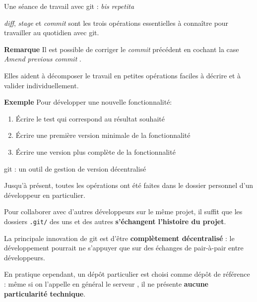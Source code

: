 \documentclass[12pt,handout,ignorenonframetext,]{beamer}
\providecommand{\tightlist}{%
  \setlength{\itemsep}{0pt}\setlength{\parskip}{0pt}}
\newcommand{\intertitre}[1]{\textbf{\textcolor{redInsee}{#1}}}
\begin{document}
\begin{frame}{Une séance de travail avec git : \emph{bis repetita}}

\emph{diff}, \emph{stage} et \emph{commit} sont les trois opérations
essentielles à connaître pour travailler au quotidien avec git.

\bigskip \pause \intertitre{Remarque} Il est possible de corriger le
\emph{commit} précédent en cochant la case
\og \textit{Amend previous commit} \fg{}.

\bigskip \pause Elles aident à décomposer le travail en petites
opérations faciles à décrire et à valider individuellement.

\bigskip \pause \intertitre{Exemple} Pour développer une nouvelle
fonctionnalité:

\begin{enumerate}
\def\labelenumi{\arabic{enumi}.}
\tightlist
\item
  Écrire le test qui correspond au résultat souhaité
\item
  Écrire une première version minimale de la fonctionnalité
\item
  Écrire une version plus complète de la fonctionnalité
\end{enumerate}

\end{frame}

\begin{frame}[fragile]{\large git : un outil de gestion de version
décentralisé}

Jusqu'à présent, toutes les opérations ont été faites dans le dossier
personnel d'un développeur en particulier.

\bigskip \pause Pour collaborer avec d'autres développeurs sur le même
projet, il suffit que les dossiers \texttt{.git/} des uns et des autres
\textbf{s'échangent l'histoire du projet}.

\bigskip \pause La principale innovation de git est d'être
\textbf{complètement décentralisé} : le développement pourrait ne
s'appuyer que sur des échanges \og de pair-à-pair \fg{} entre
développeurs.

\bigskip \pause En pratique cependant, un dépôt particulier est choisi
comme dépôt de référence : même si on l'appelle en général le
\og serveur \fg{}, il ne présente \textbf{aucune particularité
technique}.

\end{frame}
\end{document}
